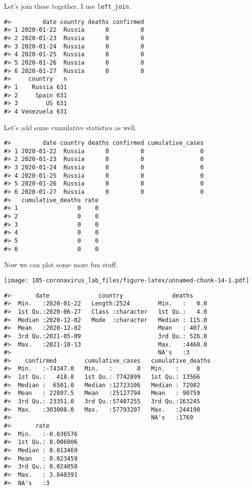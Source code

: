 \documentclass[
]{book}
\begin{document}
Let's join these together. I use \texttt{left\_join}.

\begin{verbatim}
#>         date country deaths confirmed
#> 1 2020-01-22  Russia      0         0
#> 2 2020-01-23  Russia      0         0
#> 3 2020-01-24  Russia      0         0
#> 4 2020-01-25  Russia      0         0
#> 5 2020-01-26  Russia      0         0
#> 6 2020-01-27  Russia      0         0
#>     country   n
#> 1    Russia 631
#> 2     Spain 631
#> 3        US 631
#> 4 Venezuela 631
\end{verbatim}

Let's add some cumulative statistics as well.

\begin{verbatim}
#>         date country deaths confirmed cumulative_cases
#> 1 2020-01-22  Russia      0         0                0
#> 2 2020-01-23  Russia      0         0                0
#> 3 2020-01-24  Russia      0         0                0
#> 4 2020-01-25  Russia      0         0                0
#> 5 2020-01-26  Russia      0         0                0
#> 6 2020-01-27  Russia      0         0                0
#>   cumulative_deaths rate
#> 1                 0    0
#> 2                 0    0
#> 3                 0    0
#> 4                 0    0
#> 5                 0    0
#> 6                 0    0
\end{verbatim}

Now we can plot some more fun stuff.

\texttt{[image: 105-coronavirus\_lab\_files/figure-latex/unnamed-chunk-14-1.pdf]}

\begin{verbatim}
#>       date              country              deaths      
#>  Min.   :2020-01-22   Length:2524        Min.   :   0.0  
#>  1st Qu.:2020-06-27   Class :character   1st Qu.:   4.0  
#>  Median :2020-12-02   Mode  :character   Median : 115.0  
#>  Mean   :2020-12-02                      Mean   : 407.9  
#>  3rd Qu.:2021-05-09                      3rd Qu.: 526.0  
#>  Max.   :2021-10-13                      Max.   :4460.0  
#>                                          NA's   :3       
#>    confirmed        cumulative_cases   cumulative_deaths
#>  Min.   :-74347.0   Min.   :       0   Min.   :     0   
#>  1st Qu.:   418.8   1st Qu.: 7742899   1st Qu.: 13566   
#>  Median :  6501.0   Median :12723106   Median : 72982   
#>  Mean   : 22897.5   Mean   :25127794   Mean   : 90759   
#>  3rd Qu.: 23351.0   3rd Qu.:57407255   3rd Qu.:163245   
#>  Max.   :303008.0   Max.   :57793207   Max.   :244190   
#>                                        NA's   :1769     
#>       rate          
#>  Min.   :-0.036576  
#>  1st Qu.: 0.006006  
#>  Median : 0.013469  
#>  Mean   : 0.023459  
#>  3rd Qu.: 0.024058  
#>  Max.   : 3.840391  
#>  NA's   :3
\end{verbatim}
\end{document}
